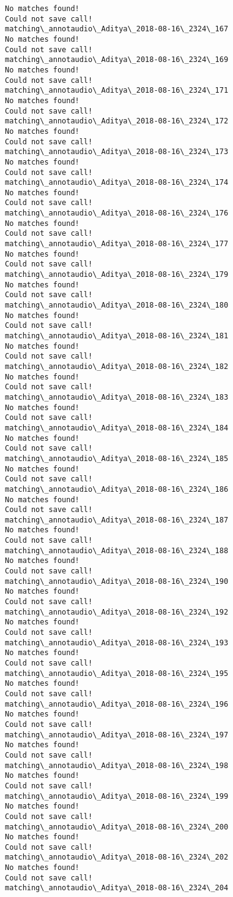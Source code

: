 \documentclass[11pt]{article}
\begin{document}
\begin{Verbatim}[commandchars=\\\{\}]
No matches found!
Could not save call!
matching\_annotaudio\_Aditya\_2018-08-16\_2324\_167
No matches found!
Could not save call!
matching\_annotaudio\_Aditya\_2018-08-16\_2324\_169
No matches found!
Could not save call!
matching\_annotaudio\_Aditya\_2018-08-16\_2324\_171
No matches found!
Could not save call!
matching\_annotaudio\_Aditya\_2018-08-16\_2324\_172
No matches found!
Could not save call!
matching\_annotaudio\_Aditya\_2018-08-16\_2324\_173
No matches found!
Could not save call!
matching\_annotaudio\_Aditya\_2018-08-16\_2324\_174
No matches found!
Could not save call!
matching\_annotaudio\_Aditya\_2018-08-16\_2324\_176
No matches found!
Could not save call!
matching\_annotaudio\_Aditya\_2018-08-16\_2324\_177
No matches found!
Could not save call!
matching\_annotaudio\_Aditya\_2018-08-16\_2324\_179
No matches found!
Could not save call!
matching\_annotaudio\_Aditya\_2018-08-16\_2324\_180
No matches found!
Could not save call!
matching\_annotaudio\_Aditya\_2018-08-16\_2324\_181
No matches found!
Could not save call!
matching\_annotaudio\_Aditya\_2018-08-16\_2324\_182
No matches found!
Could not save call!
matching\_annotaudio\_Aditya\_2018-08-16\_2324\_183
No matches found!
Could not save call!
matching\_annotaudio\_Aditya\_2018-08-16\_2324\_184
No matches found!
Could not save call!
matching\_annotaudio\_Aditya\_2018-08-16\_2324\_185
No matches found!
Could not save call!
matching\_annotaudio\_Aditya\_2018-08-16\_2324\_186
No matches found!
Could not save call!
matching\_annotaudio\_Aditya\_2018-08-16\_2324\_187
No matches found!
Could not save call!
matching\_annotaudio\_Aditya\_2018-08-16\_2324\_188
No matches found!
Could not save call!
matching\_annotaudio\_Aditya\_2018-08-16\_2324\_190
No matches found!
Could not save call!
matching\_annotaudio\_Aditya\_2018-08-16\_2324\_192
No matches found!
Could not save call!
matching\_annotaudio\_Aditya\_2018-08-16\_2324\_193
No matches found!
Could not save call!
matching\_annotaudio\_Aditya\_2018-08-16\_2324\_195
No matches found!
Could not save call!
matching\_annotaudio\_Aditya\_2018-08-16\_2324\_196
No matches found!
Could not save call!
matching\_annotaudio\_Aditya\_2018-08-16\_2324\_197
No matches found!
Could not save call!
matching\_annotaudio\_Aditya\_2018-08-16\_2324\_198
No matches found!
Could not save call!
matching\_annotaudio\_Aditya\_2018-08-16\_2324\_199
No matches found!
Could not save call!
matching\_annotaudio\_Aditya\_2018-08-16\_2324\_200
No matches found!
Could not save call!
matching\_annotaudio\_Aditya\_2018-08-16\_2324\_202
No matches found!
Could not save call!
matching\_annotaudio\_Aditya\_2018-08-16\_2324\_204

\end{Verbatim}
\end{document}
